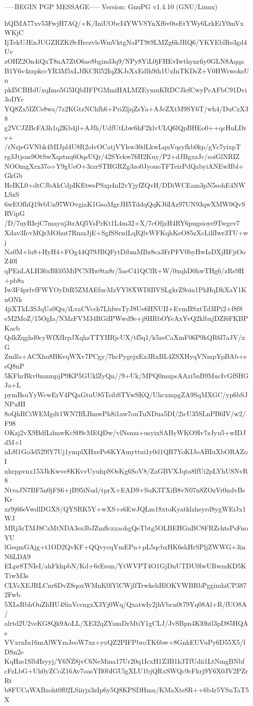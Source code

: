 -----BEGIN PGP MESSAGE-----
Version: GnuPG v1.4.10 (GNU/Linux)

hQIMA77xv53FwjH7AQ/+K/IniUObcI4YWVSYnXf6v0tsEtYWy6LrkEiY0mVxWKjC
IjTekUJEnJUGZRZKi9cHrezvleWmVktgNaPT9t9LMZg6kJRQ6/YKYEblRe3gd4Uv
zOHZ2On4iQxT8nA7ZtO6ae8bgind3q9/NPy8YiL0jFHEvIwthynrfiy0GLN8Aqqa
B1Y6v4zzpkccYR3M5xLJfKCRl52IqZKJsXxEdlh9ih1UxInTKDsZ+V0HWrwoksUn
pkI5CBHdUxqImo5G5IQbIIFPGMmiHALMZEymuKRDCJlefCwyPcAFbC91Dvi3oDYc
YQ8Zx5IZCs8wa/7z2KGtzNChfh6+PriZljqZsYa+AJeZXtM9SY6T/wh4/DuCzX38
g2VCJZBcFA3h1q2Kb4jl+AJfh/UdfUtLbw6hF2klvULQ6lQpBHEo0++qcHuLDrv+
/rNzjeGVNbk4MIJpl4U8R2olvOCatjVYlsw30dLkwLquVqsyfkb0kp/gVc7yixpT
rg3Jtjsns9OtSwXqztnq6OqsUQr/42SYekw76H2Kuy/P2+dJBgxzJc/soiGlNRIZ
NOOmgXrx37o+Y9gUeO+3rzrSTHGRZg3zo0JyouoTFTeirPdQabyiANEwHbl+GkGb
HeIKL0+dtCJbAkCdpIKEtwsPSxp4nI2vYjyfZQvH/DDiWCEam3pN5sohE4NWLSzS
6wEOfhQ19rbUn97WOvgiaK1GsoMgrJH5TddqQqKJ6IAz97UN93qwXMW0QvSRVipG
/D/7nyRIejC7mayuj3trAQ5VsPrKt1L4m32+X/7cOfjzH4RY6pugsioye9Twgev7
Xdav3IcvMQrMOhut7RmuJjE+SgfSSrzdLqIQlvWFKqhKeO85zXcLilfIwr3TU+wj
Na0M+lu8+HyH4+FOg44Q79JBQFytDibmMBz8ca3FrPFV0byHwIaDXjHFjiOoZ40l
qPEnLALH36xBE05MiPCNHw8tn8r/5aeC41QCfR+W/0xqhD0hwTHg6/zRe9H+pb8a
Iw3F4prlvfFWYOyDiR5ZMAEfucMzVYl8XWDlBVSLgkrZ9oin1PhHqDkXaY1KnONk
4jiXTkL3SJqUa0Qu/iLvaCVcch7LhfwsTyJ8Ue6HNUII+EvmBSxtTd3IPi2+f8f8
eM2MoZ/15OgIa/NMzFVM34RGiIPWwd9e+j8HRbOYeAxYvQ2klbxjDZl6FKBPKacb
QdkZqghd0cyWfXfIrpJXqhzTTYHRjcUX/tf5q1/k5zeCaXmF06P9kQR6l7aJV/xG
Zmlfa+ACXhu8BKvqWXv7PCgy/7hcPygejxEx3RxBL4ZSXHyqVNmpYpBAb+esQ8nP
5KFhrBkv0mnmpjP9KP5GUklZyQn//9+Uk/MPQ0mupsAAzi5uB9MucIvGfSHGJa+L
pymBsuYyWcwErV4PQaGtuU85TsibSTYwSKQ/UhcxmpgZA9SqMXGC/yp6bSJNPuHI
8oQhRCiWEMgdt1WN7IfLBmwPh8i1aw7ouTuNDua5DI/2icU35SLnPB6IV/w2/F98
OKzj2vX9BdfLdmwKcS09cMEQDw/vlNsmu+usyixSAByWKO9Iv7zJyu5+wIDJdM+l
nL8l1Go3d529lY7Uj1ymplXHxePe6KYAmyttui1y0d1QR7YoKIJoABIuXbORAZoI
nhrppvnx153JkKwve8KKvvUyuhpSOsKg6SoV8/ZaGBVXJqta8lfUi2pLYhUSNvR8
NtvaJN7BF5n0jFS6+jB95iNud/tprX+EAD9+SuK3TXiB8vN07n8ZOzVr0ndvBsKr
xr9j66eVwdlDGXS/QYSRK5Y+wXS+s6EwJQLm18xtoKyatklzheyrd8ygWEiJx1WJ
MRj3zTMJ8CzMtNDA3ez3bJZmflczxaohgQeTbtg5OLBEHGnBC8FRZchtsPsFnoYU
lGeqmGAjg+t1OD2QvKF+QQvycqYmEPn+pL5qcbxHK6shHrSPljZWWG+3inN6LDA9
ELpr8TNIeI/ahFkhpbN/Kd+6rEsun/YtWVPT4O1GjDnUTDU0lwURwmKD5KTiwM3s
CLVcXEJRLCnr6DvZ8qoxWMnK0lYlCWjlfTrwkehHlOKVWBRbPggimhiCP3872Fwb
5XLsRbhOuZhHU4SiaVccngxX3Yj0Wq/QxatwIy2jhVbcn0t79Yq08Al+R/fUO8A/
alrtd2U2veKG8Qk9AoLL/XE32qZYumDrMtiY1gCLJ/JvSBpn4Kl0htl3pD85HQAe
VVxrnIu16mAlWYmJeoW7xz+yxQZ2PIFPbroTK6bw+8GnkEUVuPy6D55X5/fDSn2e
KqHzs1SlbHryyj/Y6NZ8jvC6NeMma17Ur20q1IcxH1Z3B1k3TfUdii1LtNmgBNbf
cFzLbG+Uh0yZCoZ16Av7oasYB0bIGUlgXLU1bjQRxSWQc9cFkrj9Y6X0JV2PZrRt
b8FUCaWABzoht0f02LSiirjx3zIp6y5Q8KPSDHmn/KMaXts8R++6b4r5YSnTaT5X

